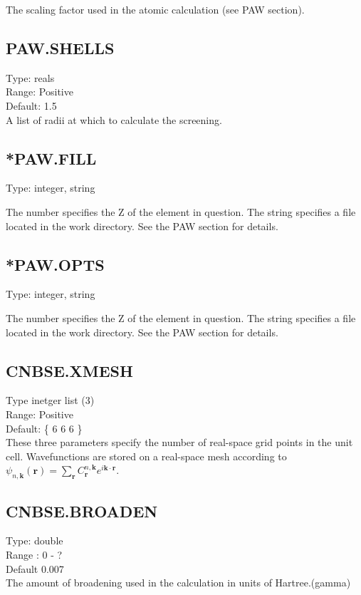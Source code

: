 \documentclass[12pt]{revtex4}
\begin{document}
The scaling factor used in the atomic calculation (see PAW section).

\subsection{PAW.SHELLS}
Type: reals \\
Range: Positive \\
Default: 1.5 \\

A list of radii at which to calculate the screening. 

\subsection{*PAW.FILL}
Type: integer, string

The number specifies the Z of the element in question. The string specifies a file located in the 
work directory. See the PAW section for details.

\subsection{*PAW.OPTS}
Type: integer, string

The number specifies the Z of the element in question. The string specifies a file located in the      
work directory. See the PAW section for details.


\subsection{CNBSE.XMESH}
Type inetger list (3) \\
Range: Positive \\
Default: \{ 6 6 6 \} \\

These three parameters specify the number of real-space grid points 
in the unit cell. Wavefunctions are stored on a real-space mesh according to 
$\psi_{n,\mathbf{k}}(\mathbf{r}) = \sum_{\mathbf{r}}C^{n,\mathbf{k}}_{\mathbf{r}} e^{i \mathbf{k} \cdot \mathbf{r}}$. 

\subsection{CNBSE.BROADEN}
Type: double \\
Range : 0 - ? \\
Default 0.007 \\

The amount of broadening used in the calculation in units of Hartree.(gamma)
\end{document}
